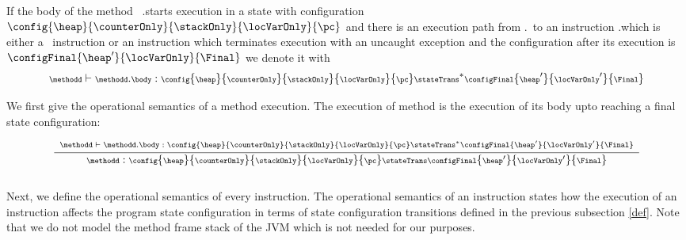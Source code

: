  \begin{transClosStateTrans} \label{stateTransClos}
    If the body of the method \methodd \ \methodd.\body starts execution in a state
    with configuration \\ $\config{ \heap}{\counterOnly}{\stackOnly}{\locVarOnly}{\pc}$ and there is an execution
    path from \method.\entryPoint \ to an instruction \method.\body[k] which is either a \return \ instruction or an 
    instruction which terminates execution with an uncaught exception and the configuration after its execution is 
    $\configFinal{ \heap'}{\locVarOnly}{\Final}$  we denote it with 
    $$ {\scriptsize \methodd \vdash \methodd.\body: \config{ \heap}{\counterOnly}{\stackOnly}{\locVarOnly}{ \pc } \stateTrans^{*} \configFinal{ \heap'}{\locVarOnly'}{\Final} }$$
 \end{transClosStateTrans}
 



 We first give the operational semantics of a method execution. The execution of method \methodd 
 is the execution of its body upto reaching a final state configuration:
 
 $$
 {\scriptsize  \frac{\begin{array}{l}
          \methodd \vdash  \methodd.\body :  
	                    \config{\heap}{\counterOnly}{\stackOnly}{\locVarOnly}{\pc} \stateTrans^{*} \configFinal{\heap'}{\locVarOnly'}{\Final}\\
	\end{array}	 
       }
       {\methodd :  \config{\heap}{\counterOnly}{\stackOnly}{\locVarOnly}{\pc} 
		   \stateTrans 
                   \configFinal{\heap'}{\locVarOnly'} {\Final} }}$$ \\


 

   
 Next, we define the operational semantics of every instruction. The operational semantics
 of an instruction states how the execution of an instruction affects the program state configuration 
 in terms of state configuration transitions defined in the previous subsection \ref{def}.
 Note that we do not model the method frame stack of the JVM which is not needed for our purposes. 

